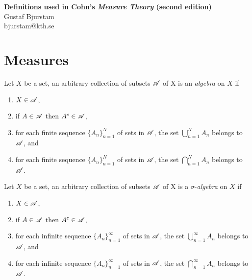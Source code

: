 \documentclass[12pt]{article}
\begin{document}
\begin{center}
\textbf{\large Definitions used in Cohn's \textit{Measure Theory} (second edition)} \\
Gustaf Bjurstam\\
bjurstam@kth.se\\
\end{center}

\section{Measures}
\begin{definition}[Algebra]
    Let $X$ be a set, an arbitrary collection of subsets $\mathscr{A}$ of X is an \textit{algebra} on $X$ if
    \begin{enumerate}[label=(\alph*)]
        \item $X\in\mathscr{A}$,
        \item if $A\in\mathscr{A}$ then $A^c\in\mathscr{A}$,
        \item for each finite sequence $\{A_n\}_{n=1}^N$ of sets in $\mathscr{A}$, the set $\bigcup_{n=1}^N A_n$ belongs to $\mathscr{A}$, and
        \item for each finite sequence $\{A_n\}_{n=1}^N$ of sets in $\mathscr{A}$, the set $\bigcap_{n=1}^N A_n$ belongs to $\mathscr{A}$.
    \end{enumerate}
\end{definition}
\begin{definition}
    Let $X$ be a set, an arbitrary collection of subsets $\mathscr{A}$ of X is a $\sigma$-\textit{algebra} on $X$ if
    \begin{enumerate}[label=(\alph*)]
        \item $X\in\mathscr{A}$,
        \item if $A\in\mathscr{A}$ then $A^c\in\mathscr{A}$,
        \item for each infinite sequence $\{A_n\}_{n=1}^\infty$ of sets in $\mathscr{A}$, the set $\bigcup_{n=1}^\infty A_n$ belongs to $\mathscr{A}$, and
        \item for each infinite sequence $\{A_n\}_{n=1}^\infty$ of sets in $\mathscr{A}$, the set $\bigcap_{n=1}^\infty A_n$ belongs to $\mathscr{A}$.
    \end{enumerate}
\end{definition}
\end{document}
